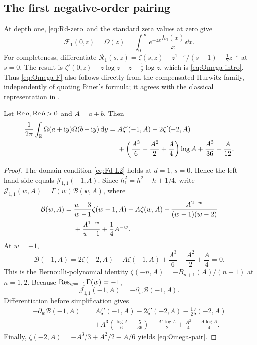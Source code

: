 \subsection{The first negative-order pairing}
At depth one, \eqref{eq:Rd-zero} and the standard zeta values at zero give
\begin{equation}\label{eq:Omega-F}
 \mathcal F_1(0,z)=\Omega(z)
    =\int_0^\infty e^{-zx}\frac{h_1(x)}x\dd x.
\end{equation}
For completeness, differentiate
$\mathcal R_1(s,z)=\zeta(s,z)-z^{1-s}/(s-1)-\frac12z^{-s}$ at $s=0$.
The result is
$\zeta'(0,z)-z\log z+z+\frac12\log z$, which is
\eqref{eq:Omega-intro}. Thus \eqref{eq:Omega-F} also follows directly
from the compensated Hurwitz family, independently of quoting Binet's
formula; it agrees with the classical representation in
\cite{dlmf-gamma}.

\begin{theorem}\label{thm:Omega-pair}
Let $\operatorname{Re} a,\operatorname{Re} b>0$ and $A=a+b$. Then
\begin{align}
 \frac1{2\pi}\int_{\mathbb R}\Omega(a+\mathrm i y)\Omega(b-\mathrm i y)\,\mathrm d y
   ={}&A\zeta'(-1,A)-2\zeta'(-2,A)\notag\\
     &+\left(\frac{A^3}{6}-\frac{A^2}{2}+\frac A4\right)\log A
           +\frac{A^3}{36}+\frac A{12}.
                  \label{eq:Omega-pair}
\end{align}
\end{theorem}
\begin{proof}
The domain condition \eqref{eq:Fd-L2} holds at $d=1$, $s=0$.
Hence the left-hand side equals $\mathcal J_{1,1}(-1,A)$.
Since $h_1^2=h^2-h+1/4$, write
$\mathcal J_{1,1}(w,A)=\Gamma(w)\mathcal B(w,A)$, where
\begin{align}
 \mathcal B(w,A)={}&\frac{w-3}{w-1}\zeta(w-1,A)-A\zeta(w,A)
       +\frac{A^{2-w}}{(w-1)(w-2)}\notag\\
       &+\frac{A^{1-w}}{w-1}+\frac14A^{-w}.
                      \label{eq:B-Stirling}
\end{align}
At $w=-1$,
\[
 \mathcal B(-1,A)=2\zeta(-2,A)-A\zeta(-1,A)
                       +\frac{A^3}{6}-\frac{A^2}{2}+\frac A4=0.
\]
This is the Bernoulli-polynomial identity
$\zeta(-n,A)=-B_{n+1}(A)/(n+1)$ at $n=1,2$.
Because $\operatorname{Res}_{w=-1}\Gamma(w)=-1$,
\[
 \mathcal J_{1,1}(-1,A)=-\partial_w\mathcal B(-1,A).
\]
Differentiation before simplification gives
\begin{align*}
 -\partial_w\mathcal B(-1,A)={}&
 A\zeta'(-1,A)-2\zeta'(-2,A)-\tfrac12\zeta(-2,A)\\
 &+A^3\left(\frac{\log A}{6}-\frac5{36}\right)
       -\frac{A^2\log A}{2}+\frac{A^2}{4}+\frac{A\log A}{4}.
\end{align*}
Finally, $\zeta(-2,A)=-A^3/3+A^2/2-A/6$ yields
\eqref{eq:Omega-pair}.
\end{proof}

